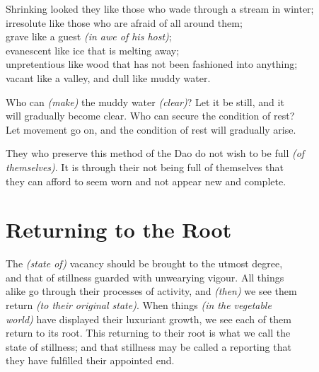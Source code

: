     Shrinking looked they like those who wade through a stream in winter;\\
    irresolute like those who are afraid of all around them;\\
    grave like a guest \textit{(in awe of his host)};\\
    evanescent like ice that is melting away;\\
    unpretentious like wood that has not been fashioned into anything;\\
    vacant like a valley, and dull like muddy water.\vspace{\baselineskip}
    
    Who can \textit{(make)} the muddy water \textit{(clear)}? Let it be still, and it\\
    will gradually become clear. Who can secure the condition of rest?\\
    Let movement go on, and the condition of rest will gradually arise.\vspace{\baselineskip}
    
    They who preserve this method of the Dao do not wish to be full \textit{(of\\
    themselves)}. It is through their not being full of themselves that\\
    they can afford to seem worn and not appear new and complete.\vspace{\baselineskip}
    
\section*{Returning to the Root}
    The \textit{(state of)} vacancy should be brought to the utmost degree,\\
    and that of stillness guarded with unwearying vigour. All things\\
    alike go through their processes of activity, and \textit{(then)} we see them\\
    return \textit{(to their original state)}. When things \textit{(in the vegetable\\
    world)} have displayed their luxuriant growth, we see each of them\\
    return to its root. This returning to their root is what we call the\\
    state of stillness; and that stillness may be called a reporting that\\
    they have fulfilled their appointed end.\vspace{\baselineskip}
    
